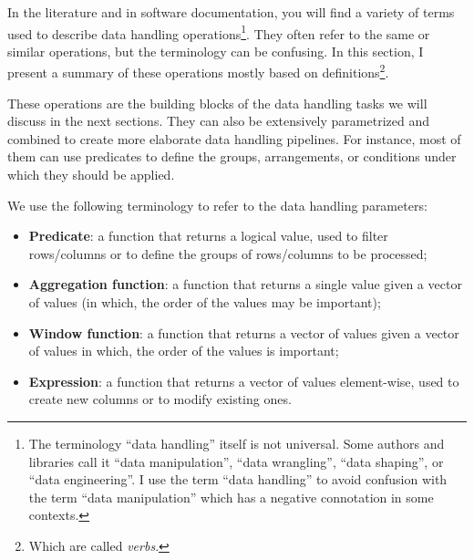 In the literature and in software documentation, you will find a variety of terms used to
describe data handling operations\footnote{%
  The terminology ``data handling'' itself is not universal.  Some authors and libraries
  call it ``data manipulation'', ``data wrangling'', ``data shaping'', or ``data
  engineering''.  I use the term ``data handling'' to avoid confusion with the term ``data
  manipulation'' which has a negative connotation in some contexts.}. %
They often refer to the same or similar operations, but the terminology can be confusing.
In this section, I present a summary of these operations mostly based on
\textcite{Wickham2023} definitions\footnote{Which are called \emph{verbs}.}.


These operations are the building blocks of the data handling tasks we will discuss in the
next sections.  They can also be extensively parametrized and combined to create more
elaborate data handling pipelines.  For instance, most of them can use predicates to
define the groups, arrangements, or conditions under which they should be applied.

We use the following terminology to refer to the data handling parameters:
\begin{itemize}
  \item \textbf{Predicate}: a function that returns a logical value, used to filter
    rows/columns or to define the groups of rows/columns to be processed;
  \item \textbf{Aggregation function}: a function that returns a single value given a vector
    of values (in which, the order of the values may be important);
  \item \textbf{Window function}: a function that returns a vector of values given a vector
    of values in which, the order of the values is important;
  \item \textbf{Expression}: a function that returns a vector of values element-wise, used to create new
    columns or to modify existing ones.
\end{itemize}


